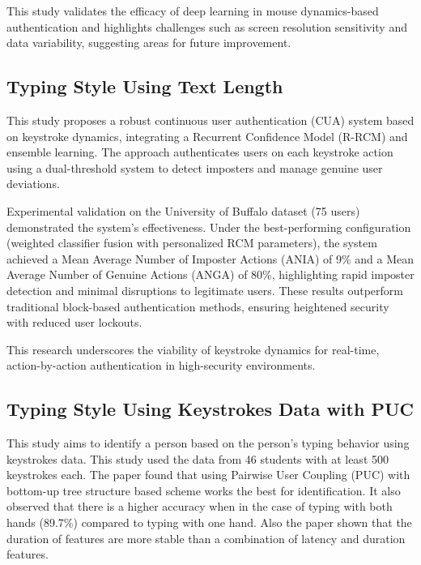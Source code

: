 This study validates the efficacy of deep learning in mouse dynamics-based authentication and highlights challenges such as screen resolution sensitivity and data variability, suggesting areas for future improvement.

\subsection{Typing Style Using Text Length}

\parencite{30_Typing_Textlength} This study proposes a robust continuous user authentication (CUA) system based on keystroke dynamics, integrating a Recurrent Confidence Model (R-RCM) and ensemble learning. The approach authenticates users on each keystroke action using a dual-threshold system to detect imposters and manage genuine user deviations.

Experimental validation on the University of Buffalo dataset (75 users) demonstrated the system's effectiveness. Under the best-performing configuration (weighted classifier fusion with personalized RCM parameters), the system achieved a Mean Average Number of Imposter Actions (ANIA) of 9\% and a Mean Average Number of Genuine Actions (ANGA) of 80\%, highlighting rapid imposter detection and minimal disruptions to legitimate users. These results outperform traditional block-based authentication methods, ensuring heightened security with reduced user lockouts.

This research underscores the viability of keystroke dynamics for real-time, action-by-action authentication in high-security environments.

\subsection{Typing Style Using Keystrokes Data with PUC}
\label{subsec:typing-style-using-keystrokes-data}

\parencite{22_Keystroke} This study aims to identify a person based on the person's typing behavior using keystrokes data.
This study used the data from 46 students with at least 500 keystrokes each.
The paper found that using Pairwise User Coupling (PUC) with bottom-up tree structure based scheme works the best for identification.
It also observed that there is a higher accuracy when in the case of typing with both hands (89.7\%) compared to typing with one hand.
Also the paper shown that the duration of features are more stable than a combination of latency and duration features.

